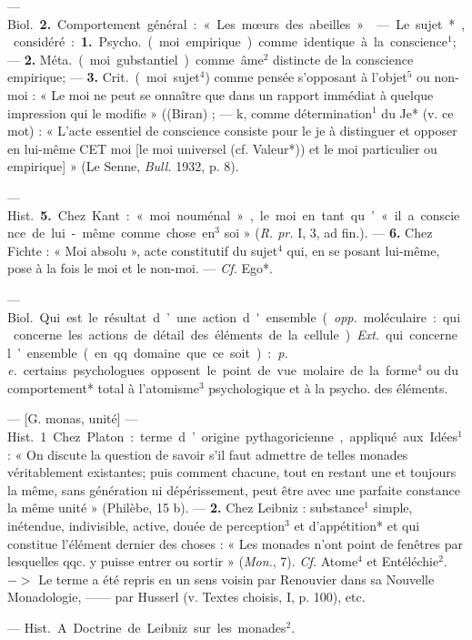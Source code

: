 \begin{itemize}[leftmargin=1cm, label=, itemsep=1pt]
— \si{Biol.} {\bf 2.} Comportement général : « Les mœurs des abeilles ».

 — Le sujet*, considéré : {\bf 1.} \si{Psycho.}
(moi empirique) comme identique à
la conscience$^1$; — {\bf 2.} \si{Méta.} (moi
gubstantiel) comme âme$^2$ distincte
de la conscience empirique; — {\bf 3.}
\si{Crit.} (moi sujet$^4$) comme pensée
s'opposant à l'objet$^5$ ou non-moi :
« Le moi ne peut se onnaître que
dans un rapport immédiat à quelque
impression qui le modifie » ((Biran) ;
— k, comme détermination$^1$ du Je*
(v. ce mot) : « L’acte essentiel de
conscience consiste pour le je à distinguer et opposer en lui-même CET
moi [le moi universel (cf. Valeur*))
et le moi particulier ou empirique] » (Le Senne, {\it Bull.} 1932, p. 8).

— \si{Hist.} {\bf 5.} Chez Kant : « moi nouménal », le moi en tant qu’ « il a
conscience de lui-même comme
chose en$^3$ soi » ({\it R. pr.} I, 3, ad fin.). —
 {\bf 6.} Chez Fichte : « Moi absolu », acte
constitutif du sujet$^4$ qui, en se posant lui-même, pose à la fois le moi
et le non-moi. — {\it Cf.} Ego*.

 — \si{Biol.} Qui est le résultat
d’une action d'ensemble ({\it opp.} moléculaire : qui concerne les actions de
détail des éléments de la cellule).
{\it Ext.} qui concerne l’ensemble (en
qq. domaine que ce soit) : {\it p. e.} certains psychologues opposent le point
de vue molaire de la forme$^4$ ou du
comportement* total à l’atomisme$^3$
psychologique et à la psycho. des
éléments.

 — [G. monas, unité] — \si{Hist.}
1. Chez Platon : terme d’origine
pythagoricienne, appliqué . aux
Idées$^1$ : « On discute la question de
savoir s’il faut admettre de telles
monades véritablement existantes;
puis comment chacune, tout en
restant une et toujours la même,
sans génération ni dépérissement,
peut être avec une parfaite constance la même unité » (Philèbe, 15 b).
— {\bf 2.} Chez Leibniz : substance$^1$
simple, inétendue, indivisible, active,
douée de perception$^3$ et d’appétition* et qui constitue l'élément dernier des choses : « Les monades n’ont
point de fenêtres par lesquelles qqc.
y puisse entrer ou sortir » ({\it Mon.}, 7).
{\it Cf.} Atome$^4$ et Entéléchie$^2$. $->$ Le
terme a été repris en un sens voisin
par Renouvier dans sa Nouvelle
Monadologie, —— par Husserl (v.
Textes choisis, I, p. 100), etc.

 — \si{Hist.} A. Doctrine de
Leibniz sur les monades$^2$.


\end{itemize}
